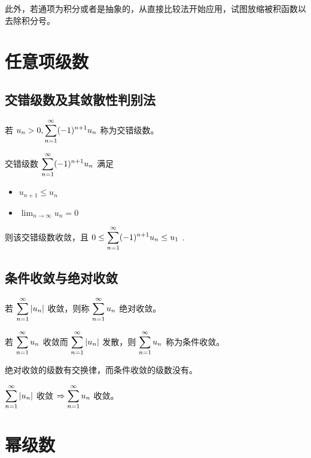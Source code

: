 此外，若通项为积分或者是抽象的，从直接比较法开始应用，试图放缩被积函数以去除积分号。

\section{任意项级数}

\subsection{交错级数及其敛散性判别法}

\begin{Def}[交错级数]

    若 $\displaystyle u_n>0,\sum_{n=1}^{\infty}(-1)^{n+1}u_n $ 称为交错级数。
\end{Def}

\begin{Theo}[莱布尼茨判别法]

    交错级数 $\displaystyle \sum_{n=1}^{\infty}(-1)^{n+1}u_n $ 满足
    \begin{itemize}
        \item $ u_{n+1}\leq u_n $ 
        \item $ {\displaystyle\lim_{n\rightarrow \infty}}u_n = 0 $ 
    \end{itemize}
    则该交错级数收敛，且 $\displaystyle 0\leq \sum_{n=1}^{\infty}(-1)^{n+1}u_n\leq u_1 $ .
\end{Theo}

\subsection{条件收敛与绝对收敛}

\begin{Def}[条件收敛与绝对收敛]

    若 $ \displaystyle \sum_{n=1}^{\infty}|u_n| $ 收敛，则称 $ \displaystyle \sum_{n=1}^{\infty}u_n $ 绝对收敛。

    若 $ \displaystyle \sum_{n=1}^{\infty}u_n $ 收敛而 $ \displaystyle \sum_{n=1}^{\infty}|u_n| $ 发散，则
    $ \displaystyle \sum_{n=1}^{\infty}u_n $ 称为条件收敛。
\end{Def}

绝对收敛的级数有交换律，而条件收敛的级数没有。

\begin{Theo}[条件收敛必收敛]

    $ \displaystyle \sum_{n=1}^{\infty}|u_n|$ 收敛 $\displaystyle \Rightarrow \sum_{n=1}^{\infty}u_n $ 收敛。
\end{Theo}

\section{幂级数}


